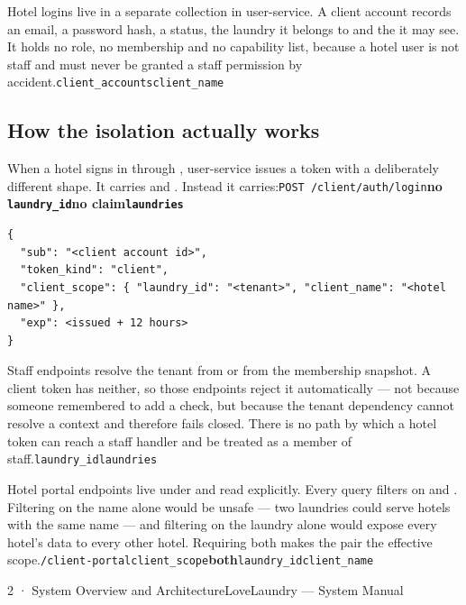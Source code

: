 \documentclass[11pt,a4paper,oneside]{book}
\begin{document}
Hotel logins live in a separate  collection in user-service. A client account records an email, a password hash, a status, the laundry it belongs to and the  it may see. It holds no role, no membership and no capability list, because a hotel user is not staff and must never be granted a staff permission by accident.\texttt{client\_accounts}\texttt{client\_name}

\subsection*{How the isolation actually works}
When a hotel signs in through , user-service issues a token with a deliberately different shape. It carries  and . Instead it carries:\texttt{POST /client/auth/login}\textbf{no \texttt{laundry\_id}}\textbf{no  claim\texttt{laundries}}

\begin{verbatim}
{
  "sub": "<client account id>",
  "token_kind": "client",
  "client_scope": { "laundry_id": "<tenant>", "client_name": "<hotel name>" },
  "exp": <issued + 12 hours>
}
\end{verbatim}
Staff endpoints resolve the tenant from  or from the  membership snapshot. A client token has neither, so those endpoints reject it automatically — not because someone remembered to add a check, but because the tenant dependency cannot resolve a context and therefore fails closed. There is no path by which a hotel token can reach a staff handler and be treated as a member of staff.\texttt{laundry\_id}\texttt{laundries}

Hotel portal endpoints live under  and read  explicitly. Every query filters on   and . Filtering on the name alone would be unsafe — two laundries could serve hotels with the same name — and filtering on the laundry alone would expose every hotel's data to every other hotel. Requiring both makes the pair the effective scope.\texttt{/client-portal}\texttt{client\_scope}\textbf{both}\texttt{laundry\_id}\texttt{client\_name}

2 · System Overview and ArchitectureLoveLaundry — System Manual
\end{document}
